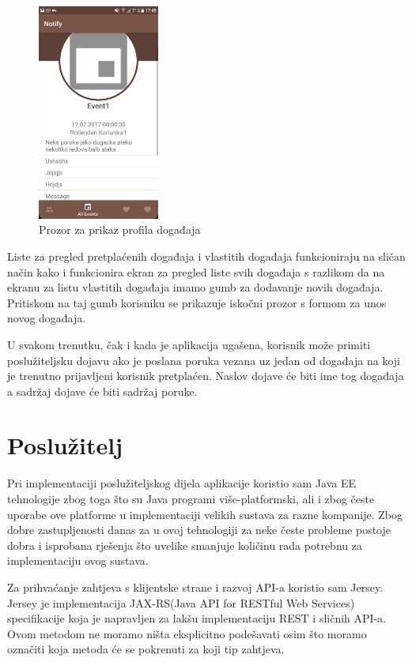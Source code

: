 \documentclass[times, utf8, zavrsni]{fer}
\begin{document}
{\begin{figure}[htb]
\centering
\includegraphics[width=4cm]{img/ss-event-profile.png}
\caption{Prozor za prikaz profila događaja}
\label{fig:user-event-image}
\end{figure}

Liste za pregled pretplaćenih događaja i vlastitih događaja funkcioniraju na sličan način kako i funkcionira ekran za pregled liste svih događaja s razlikom da na ekranu za listu vlastitih događaja imamo gumb za dodavanje novih događaja. Pritiskom na taj gumb korisniku se prikazuje iskočni prozor s formom za unos novog događaja.

U svakom trenutku, čak i kada je aplikacija ugašena, korisnik može primiti poslužiteljsku dojavu ako je poslana poruka vezana uz jedan od događaja na koji je trenutno prijavljeni korisnik pretplaćen. Naslov dojave će biti ime tog događaja a sadržaj dojave će biti sadržaj poruke.

\section{Poslužitelj}

Pri implementaciji poslužiteljskog dijela aplikacije koristio sam Java EE tehnologije zbog toga što su Java programi više-platformski, ali i zbog česte uporabe ove platforme u implementaciji velikih sustava za razne kompanije. Zbog dobre zastupljenosti danas za u ovoj tehnologiji za neke česte probleme postoje dobra i isprobana rješenja što uvelike smanjuje količinu rada potrebnu za implementaciju ovog sustava.

Za prihvaćanje zahtjeva s klijentske strane i razvoj API-a koristio sam Jersey. Jersey je implementacija JAX-RS(Java API for RESTful Web Services) specifikacije koja je napravljen za lakšu implementaciju REST i sličnih API-a. Ovom metodom ne moramo ništa eksplicitno podešavati osim što moramo označiti koja metoda će se pokrenuti za koji tip zahtjeva.

}
\end{document}
